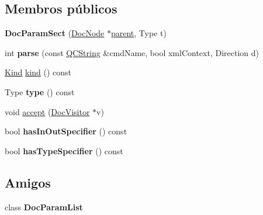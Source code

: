 \subsection*{Membros públicos}
\begin{DoxyCompactItemize}
\item 
\hypertarget{class_doc_param_sect_ae96564829064f89e6fb9d150310abab3}{{\bfseries Doc\-Param\-Sect} (\hyperlink{class_doc_node}{Doc\-Node} $\ast$\hyperlink{class_doc_node_abd7f070d6b0a38b4da71c2806578d19d}{parent}, Type t)}\label{class_doc_param_sect_ae96564829064f89e6fb9d150310abab3}

\item 
\hypertarget{class_doc_param_sect_ac28235ccef499a09ce2954659d96001d}{int {\bfseries parse} (const \hyperlink{class_q_c_string}{Q\-C\-String} \&cmd\-Name, bool xml\-Context, Direction d)}\label{class_doc_param_sect_ac28235ccef499a09ce2954659d96001d}

\item 
\hyperlink{class_doc_node_aa10c9e8951b8ccf714a59ec321bdac5b}{Kind} \hyperlink{class_doc_param_sect_aa9d037bed9f9a083d0cd01485637d843}{kind} () const 
\item 
\hypertarget{class_doc_param_sect_afbd0fa31db28593e9669c3c56711c0a7}{Type {\bfseries type} () const }\label{class_doc_param_sect_afbd0fa31db28593e9669c3c56711c0a7}

\item 
void \hyperlink{class_doc_param_sect_a7ba716e854ae2f8f87a4eb2140e302b6}{accept} (\hyperlink{class_doc_visitor}{Doc\-Visitor} $\ast$v)
\item 
\hypertarget{class_doc_param_sect_ad497b7c108a850de8e004d10f52946b5}{bool {\bfseries has\-In\-Out\-Specifier} () const }\label{class_doc_param_sect_ad497b7c108a850de8e004d10f52946b5}

\item 
\hypertarget{class_doc_param_sect_ae8b4c3b2b2f2cf54b77867e2f52cd922}{bool {\bfseries has\-Type\-Specifier} () const }\label{class_doc_param_sect_ae8b4c3b2b2f2cf54b77867e2f52cd922}

\end{DoxyCompactItemize}
\subsection*{Amigos}
\begin{DoxyCompactItemize}
\item 
\hypertarget{class_doc_param_sect_a8d559bee17ecf9f9dc8f39029d78e567}{class {\bfseries Doc\-Param\-List}}\label{class_doc_param_sect_a8d559bee17ecf9f9dc8f39029d78e567}

\end{DoxyCompactItemize}
